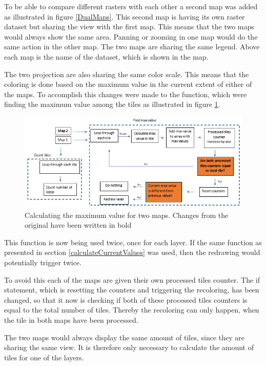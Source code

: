 To be able to compare different rasters with each other a second map was added as illustrated in figure \ref{DualMaps}. This second map is having its own raster dataset but sharing the view with the first map. This means that the two maps would always show the same area. Panning or zooming in one map would do the same action in the other map. The two maps are sharing the same legend. Above each map is the name of the dataset, which is shown in the map.  

The two projection are also sharing the same color scale. This means that the coloring is done based on the maximum value in the current extent of either of the maps. To accomplish this changes were made to the function, which were finding the maximum value among the tiles as illustrated in figure \ref{ChangeToMaxCalculation}.
 
\begin{figure} [H]
	\centering
	\includegraphics[width=1\textwidth]{Pictures/ChangeToMaxCalculation}
	\caption{Calculating the maximum value for two maps. Changes from the original have been written in bold}
	\label{ChangeToMaxCalculation}
\end{figure}

This function is now being used twice, once for each layer. If the same function as presented in section \ref{calculateCurrentValues} was used, then the redrawing would potentially trigger twice. 

To avoid this each of the maps are given their own processed tiles counter. The if statement, which is resetting the counters and triggering the recoloring, has been changed, so that it now is checking if both of these processed tiles counters is equal to the total number of tiles. Thereby the recoloring can only happen, when the tile in both maps have been processed. 

The two maps would always display the same amount of tiles, since they are sharing the same view. It is therefore only necessary to calculate the amount of tiles for one of the layers. 

